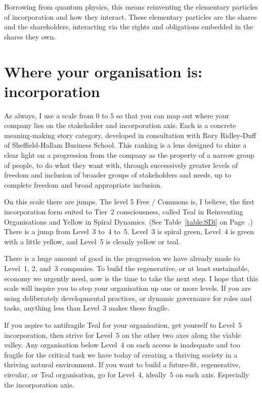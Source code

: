Borrowing from quantum physics,  this means reinventing the elementary particles of incorporation and how they interact. These elementary particles are the shares and the shareholders, interacting via the rights and obligations embedded in the shares they own. 




\section{Where your organisation is: incorporation}
\label{section:where-is-your-organisation-incorporation}


As always, I use a scale from 0 to 5 so that you can map out where your company lies on the stakeholder and incorporation axis. Each is a concrete meaning\hyp{}making story category, developed in consultation with Rory Ridley-Duff of Sheffield-Hallam Business School. This ranking is a lens designed to shine a clear light on a progression from the company as the property of a narrow group of people, to do what they want with, through successively greater levels of freedom and inclusion of broader groups of stakeholders and needs, up to complete freedom and broad appropriate inclusion.


On this scale there are jumps. The level 5 Free / Commons is, I believe, the first incorporation form suited to Tier~2 consciousness, called Teal in Reinventing Organisations\cite{laloux-RO} and Yellow in Spiral Dynamics\cite{beck-SD}. (See Table~\ref{table:SDi} on Page~\pageref{table:SDi}.) There is a jump from Level~3 to~4 to~5. Level~3 is spiral green, Level~4 is green with a little yellow, and Level~5 is cleanly yellow or teal.


There is a huge amount of good in the progression we have already made to Level~1, 2, and~3 companies. To build the regenerative, or at least sustainable, economy we urgently need, now is the time to take the next step. I hope that this scale will inspire you to step your organisation up one or more levels. If you are using deliberately developmental practices, or dynamic governance for roles and tasks, anything less than Level~3 makes these fragile. 


If you aspire to antifragile Teal for your organisation, get yourself to Level~5 incorporation, then strive for Level~5 on the other two axes along the viable valley. Any organisation below Level~4 on each access is inadequate and too fragile for the critical task we have today of creating a thriving society in a thriving natural environment. If you want to build a future-fit, regenerative, circular, or Teal organisation, go for Level~4, ideally~5 on each axis. Especially the incorporation axis.



